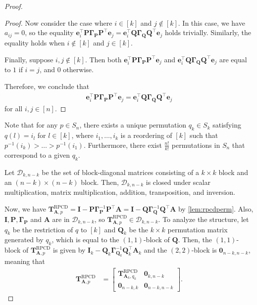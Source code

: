 \documentclass{article}
\theoremstyle{plain}
\theoremstyle{definition}
\theoremstyle{remark}
\newcommand{\mGamma}{\bm{\Gamma}}
\newcommand{\RPCD}{\text{RPCD}} %
\def\vzero{{\bm{0}}}
\def\ve{{\bm{e}}}
\def\mA{{\bm{A}}}
\def\mI{{\bm{I}}}
\def\mP{{\bm{P}}}
\def\mQ{{\bm{Q}}}
\def\mT{{\bm{T}}}
\def\gD{{\mathcal{D}}}
\begin{document}
\begin{proof}
\begin{proof}
    Now consider the case where $i\in [k]$ and $j\notin [k]$. In this case, we have $a_{ij} = 0$, so the equality $\ve_i^{\top} \mP \mGamma_{\mP} \mP^{\top} \ve_j = \ve_i^{\top} \mQ \mGamma_{\mQ} \mQ^{\top} \ve_j$    holds trivially. Similarly, the equality holds when $i\notin [k]$ and $j\in [k]$.

    Finally, suppose $i,j \notin [k]$. Then both $\ve_i^{\top} \mP \mGamma_{\mP} \mP^{\top} \ve_j$ and $\ve_i^{\top} \mQ \mGamma_{\mQ} \mQ^{\top} \ve_j$ are equal to $1$ if $i=j$, and $0$ otherwise. 

    Therefore, we conclude that
    \begin{align*}
        \ve_i^{\top} \mP \mGamma_{\mP} \mP^{\top} \ve_j = \ve_i^{\top} \mQ \mGamma_{\mQ} \mQ^{\top} \ve_j
    \end{align*}
    for all $i,j\in [n]$.
\end{proof}
Note that for any $p \in S_n$, there exists a unique permutation $q_k \in S_k$ satisfying $q(l) = i_l$ for $l \in [k]$, where $i_1, \dots, i_k$ is a reordering of $[k]$ such that $p^{-1}(i_k) > \dots > p^{-1}(i_1)$. Furthermore, there exist $\frac{n!}{k!}$ permutations in $S_n$ that correspond to a given $q_k$.

Let $\gD_{k, n-k}$ be the set of block-diagonal matrices consisting of a $k \times k$ block and an $(n-k) \times (n-k)$ block. Then, $\gD_{k, n-k}$ is closed under scalar multiplication, matrix multiplication, addition, transposition, and inversion.

Now, we have $\mT_{\mA, p}^{\RPCD} = \mI - \mP \mGamma_{\mP}^{-1} \mP^{\top} \mA = \mI - \mQ \mGamma_{\mQ}^{-1} \mQ^{\top} \mA$ by \cref{lem:rpcdperm}. Also, $\mI, \mP, \mGamma_{\mP}$ and $\mA$ are in $\gD_{k, n-k}$, so $\mT_{\mA, p}^{\RPCD}\in \gD_{k, n-k}$. To analyze the structure, let $q_k$ be the restriction of $q$ to $[k]$ and $\mQ_k$ be the $k\times k$ permutation matrix generated by $q_k$, which is equal to the $(1,1)$-block of $\mQ$. Then, the $(1,1)$-block of $\mT_{\mA, p}^{\RPCD}$ is given by $\mI_k - \mQ_k \mGamma_{\mQ_k}^{-1} \mQ_k^{\top} \mA_k$ and the $(2,2)$-block is $\vzero_{n-k,n-k}$, meaning that 
\begin{align*}
    \mT_{\mA, p}^{\RPCD} &= 
    \begin{bmatrix}
        \mT_{\mA_k, q_k}^{\RPCD} & \vzero_{k, n-k}\\
        \vzero_{n-k, k} & \vzero_{n-k, n-k}
    \end{bmatrix}.
\end{align*}


\end{proof}
\end{document}
